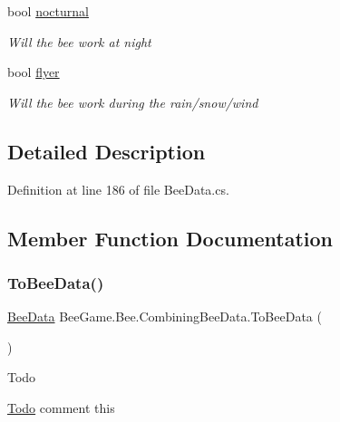\begin{DoxyCompactItemize}
bool \hyperlink{struct_bee_game_1_1_bee_1_1_combining_bee_data_a337800df462a764c58328d21d2398d6c}{nocturnal}
\begin{DoxyCompactList}\small\item\em Will the bee work at night \end{DoxyCompactList}\item 
bool \hyperlink{struct_bee_game_1_1_bee_1_1_combining_bee_data_ac0af7556cf90035ff830a6e121e8d4c4}{flyer}
\begin{DoxyCompactList}\small\item\em Will the bee work during the rain/snow/wind \end{DoxyCompactList}\end{DoxyCompactItemize}


\subsection{Detailed Description}


Definition at line 186 of file Bee\+Data.\+cs.



\subsection{Member Function Documentation}
\mbox{\label{struct_bee_game_1_1_bee_1_1_combining_bee_data_a8f49452b4800bbc401a225e2676eeca0}} 
\subsubsection{\texorpdfstring{To\+Bee\+Data()}{ToBeeData()}}
{\footnotesize\ttfamily \hyperlink{struct_bee_game_1_1_bee_1_1_bee_data}{Bee\+Data} Bee\+Game.\+Bee.\+Combining\+Bee\+Data.\+To\+Bee\+Data (\begin{DoxyParamCaption}{ }\end{DoxyParamCaption})}





\begin{DoxyRefDesc}{Todo}
\item[\hyperlink{todo__todo000003}{Todo}]comment this \end{DoxyRefDesc}

